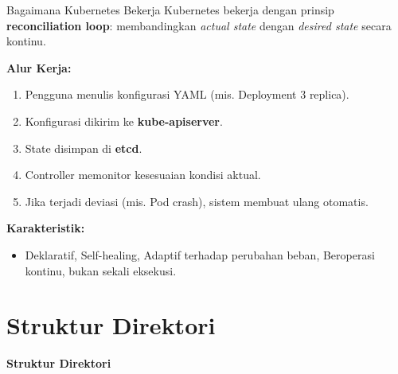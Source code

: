 \documentclass[aspectratio=169, table]{beamer}
\begin{document}
\begin{frame}{Bagaimana Kubernetes Bekerja}
\vspace{10pt}
Kubernetes bekerja dengan prinsip \textbf{reconciliation loop}:
membandingkan \textit{actual state} dengan \textit{desired state} secara kontinu.

\vspace{6pt}
\textbf{Alur Kerja:}
\begin{enumerate}\small
    \item Pengguna menulis konfigurasi YAML (mis. Deployment 3 replica).
    \item Konfigurasi dikirim ke \textbf{kube-apiserver}.
    \item State disimpan di \textbf{etcd}.
    \item Controller memonitor kesesuaian kondisi aktual.
    \item Jika terjadi deviasi (mis. Pod crash), sistem membuat ulang otomatis.
\end{enumerate}

\vspace{6pt}
\textbf{Karakteristik:}
\begin{itemize}\small
    \item Deklaratif, Self-healing, Adaptif terhadap perubahan beban, Beroperasi kontinu, bukan sekali eksekusi.
\end{itemize}
\end{frame}

\section{Struktur Direktori}
\begin{frame}{\hfill}
	\centering
	\Huge{\textbf{Struktur Direktori}}
\end{frame}
\end{document}
